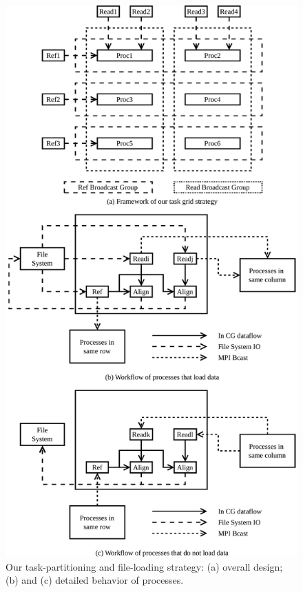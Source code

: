 \documentclass[conference]{IEEEtran}
\begin{document}
\begin{figure}[!htb]
  \includegraphics[width=\linewidth]{figures/GridNew}
  \caption{Our task-partitioning and file-loading strategy: (a)
    overall design; (b) and (c) detailed behavior of processes.}
  \label{TaskGrid}
\end{figure}
\end{document}

